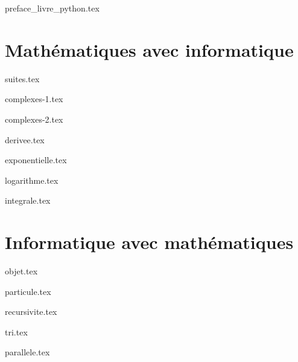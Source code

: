 \documentclass[10pt,twoside,openright]{report}
\begin{document}
\renewcommand{\contentsname}{Sommaire}

{preface_livre_python.tex}
\debutchapitres
{}


\clearemptydoublepage



\part{Mathématiques avec informatique}

{suites.tex}

{complexes-1.tex}

{complexes-2.tex}

{derivee.tex}

{exponentielle.tex}

{logarithme.tex}

{integrale.tex}



\clearemptydoublepage
\part{Informatique avec mathématiques}

{objet.tex}

{particule.tex}

{recursivite.tex}

{tri.tex}

{parallele.tex}


\clearemptydoublepage
\end{document}
